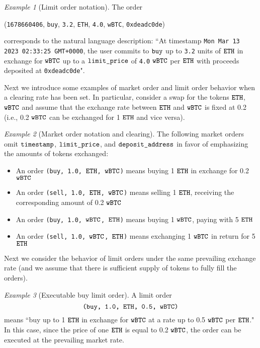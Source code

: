 \documentclass[11pt, reqno]{amsart}
\theoremstyle{definition}
\theoremstyle{remark}
\newtheorem{exmp}{Example}[subsection]
\newcommand{\BTC}{\textnormal{\texttt{wBTC}}}
\newcommand{\ETH}{\textnormal{\texttt{ETH}}}
\newcommand{\timestamp}{\textnormal{\texttt{timestamp}}}
\newcommand{\limitprice}{\textnormal{\texttt{limit\_price}}}
\newcommand{\depositaddress}{\textnormal{\texttt{deposit\_address}}}
\newcommand{\buy}{\textnormal{\texttt{buy}}}
\newcommand{\sell}{\textnormal{\texttt{sell}}}
\begin{document}
\begin{exmp}[Limit order notation]
The order
\begin{center}
(\textnormal{\texttt{1678660406}},
\buy,
\textnormal{\texttt{3.2}},
\ETH,
\textnormal{\texttt{4.0}},
\BTC,
\textnormal{\texttt{0xdeadc0de}})
\end{center}
corresponds to the natural language description:
``At timestamp \textnormal{\texttt{Mon Mar 13 2023 02:33:25 GMT+0000}}, the user
commits to $\buy$ up to \textnormal{\texttt{3.2}} units of $\ETH$ in exchange
for $\BTC$ up to a $\limitprice$ of \textnormal{\texttt{4.0}} $\BTC$ per $\ETH$
with proceeds deposited at \textnormal{\texttt{0xdeadc0de}}".
\end{exmp}

Next we introduce some examples of market order and limit order behavior when
a clearing rate has been set.
In particular, consider a swap for the tokens $\ETH$, $\BTC$ and assume that
the exchange rate between $\ETH$ and $\BTC$ is fixed at 0.2 (i.e.,
0.2 $\BTC$ can be exchanged for 1 $\ETH$ and vice versa).

\begin{exmp}[Market order notation and clearing]
The following market orders omit $\timestamp$, $\limitprice$, and
$\depositaddress$ in favor of emphasizing the amounts of tokens exchanged:
\begin{itemize}
    \item An order \texttt{(\buy, 1.0, $\ETH$, $\BTC$)} means buying 1
          $\ETH$ in exchange for 0.2 $\BTC$
    \item An order \texttt{(\sell, 1.0, $\ETH$, $\BTC$)} means selling 1 $\ETH$,
          receiving the corresponding amount of 0.2 $\BTC$
    \item An order \texttt{(\buy, 1.0, $\BTC$, $\ETH$)} means buying 1 $\BTC$,
          paying with 5 $\ETH$
    \item An order \texttt{(\sell, 1.0, $\BTC$, $\ETH$)} means exchanging
          1 $\BTC$ in return for 5 $\ETH$
\end{itemize}
\end{exmp}

Next we consider the behavior of limit orders under the same prevailing exchange
rate (and we assume that there is sufficient supply of tokens to fully fill the
orders).

\begin{exmp}[Executable buy limit order]
A limit order
\[
    \texttt{(\buy, 1.0, $\ETH$, 0.5, $\BTC$)}
\]
means
``buy up to 1 $\ETH$ in exchange for $\BTC$ at a rate up to 0.5 $\BTC$ per $\ETH$."
In this case, since the price of one $\ETH$ is equal to 0.2 $\BTC$, the order
can be executed at the prevailing market rate.
\end{exmp}
\end{document}
